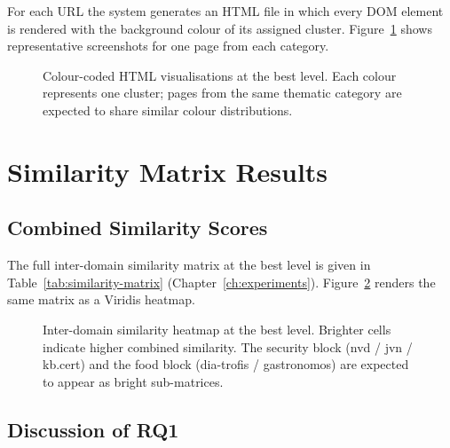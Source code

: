 For each URL the system generates an HTML file in which every DOM element is rendered with the background colour of its assigned cluster. Figure~\ref{fig:html-vis} shows representative screenshots for one page from each category.

\begin{figure}[htbp]
    \centering
    \caption{Colour-coded HTML visualisations at the best level. Each colour represents one cluster; pages from the same thematic category are expected to share similar colour distributions.}
    \label{fig:html-vis}
\end{figure}

\section{Similarity Matrix Results}
\label{sec:similarity-results}

\subsection{Combined Similarity Scores}

The full inter-domain similarity matrix at the best level is given in Table~\ref{tab:similarity-matrix} (Chapter~\ref{ch:experiments}). Figure~\ref{fig:heatmap-result} renders the same matrix as a Viridis heatmap.

\begin{figure}[htbp]
    \centering
    \caption{Inter-domain similarity heatmap at the best level. Brighter cells indicate higher combined similarity. The security block (nvd / jvn / kb.cert) and the food block (dia-trofis / gastronomos) are expected to appear as bright sub-matrices.}
    \label{fig:heatmap-result}
\end{figure}

\subsection{Discussion of RQ1}

